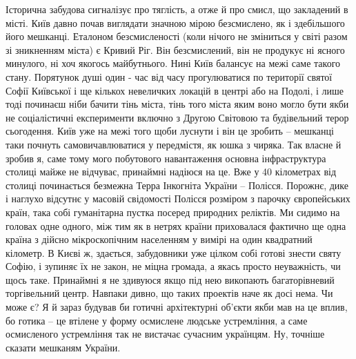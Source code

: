 Історична забудова сигналізує про тяглість, а отже й про смисл, що закладений в місті. Київ давно почав виглядати значною мірою безсмислено, як і здебільшого його мешканці. Еталоном безсмисленості (коли нічого не зміниться у світі разом зі зникненням міста) є Кривий Ріг. Він безсмислений, він не продукує ні ясного минулого, ні хоч якогось майбутнього. Нині Київ балансує на межі саме такого стану. 
Порятунок душі один - час від часу прогулюватися по території святої Софії Київської і ще кількох невеличких локацій в центрі або на Подолі, і лише тоді починаєш ніби бачити тінь міста, тінь того міста яким воно могло бути якби не соціалістичні експерименти включно з Другою Світовою та  будівельний терор сьогодення. 
Київ уже на межі того щоби луснути і він це зробить – мешканці таки почнуть самовичавлюватися у передмістя, як юшка з чиряка. Так власне й зробив я, саме тому мого побутового навантаження основна інфраструктура столиці майже не відчуває, принаймні надіюся на це.
Вже у 40 кілометрах від столиці починається безмежна Терра Інкогніта України – Полісся. Порожнє, дике і наглухо відсутнє у масовій свідомості Полісся розміром з парочку європейських країн, така собі гуманітарна пустка посеред природних реліктів. Ми сидимо на головах одне одного, між тим як в нетрях країни приховалася фактично ще одна країна з дійсно мікроскопічним населенням у вимірі на один квадратний кілометр.
В Києві ж, здається, забудовники уже цілком собі готові знести святу Софію, і зупиняє їх не закон, не міцна громада, а якась просто неуважність, чи щось таке. Принаймні я не здивуюся якщо під нею викопають багаторівневий торгівельний центр. Навпаки дивно, що таких проектів наче як досі нема.
Чи може є? 
Я й зараз будував би готичні архітектурні об'єкти якби мав на це вплив, бо готика – це втілене у форму осмислене людське устремління, а саме осмисленого устремління так не вистачає сучасним українцям. Ну, точніше сказати мешканям України.
